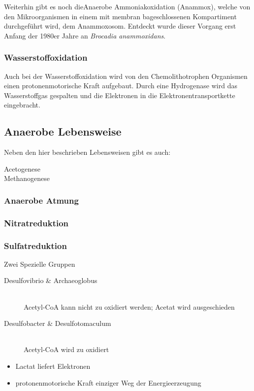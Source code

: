 Weiterhin gibt es noch dieAnaerobe Ammoniakoxidation (Anammox),
welche von den Mikroorganismen in einem mit membran bageschlossenen Kompartiment 
durchgeführt wird,
dem Anammoxosom.
Entdeckt wurde dieser Vorgang erst Anfang der 1980er Jahre an \emph{Brocadia anammoxidans}.
\\

\subsubsection{Wasserstoffoxidation}
Auch bei der Wasserstoffoxidation wird von den Chemolithotrophen Organismen
einen protonenmotorische Kraft aufgebaut.
Durch eine Hydrogenase wird das Wasserstoffgas gespalten
und die Elektronen in die Elektronentransportkette eingebracht.

\subsection{Anaerobe Lebensweise}
Neben den hier beschrieben Lebensweisen gibt es auch:
\begin{description}
	\item[Acetogenese]
	\item[Methanogenese]
\end{description}

\subsubsection{Anaerobe Atmung}
\subsubsection{Nitratreduktion}
\subsubsection{Sulfatreduktion}
Zwei Spezielle Gruppen
\begin{description}
	\item[Desulfovibrio \& Archaeoglobus] \hfill \\
		Acetyl-CoA kann nicht zu  oxidiert werden; Acetat wird ausgeschieden
	\item[Desulfobacter \& Desulfotomaculum] \hfill \\
		Acetyl-CoA wird zu  oxidiert
\end{description}

\begin{itemize}
	\item Lactat liefert Elektronen
	\item protonenmotorische Kraft einziger Weg der Energieerzeugung
\end{itemize}

